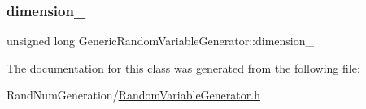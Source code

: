 \subsubsection{\texorpdfstring{dimension\+\_\+}{dimension\_}}
{\footnotesize\ttfamily unsigned long Generic\+Random\+Variable\+Generator\+::dimension\+\_\+\hspace{0.3cm}{\ttfamily [protected]}}



The documentation for this class was generated from the following file\+:\begin{DoxyCompactItemize}
\item 
Rand\+Num\+Generation/\hyperlink{_random_variable_generator_8h}{Random\+Variable\+Generator.\+h}\end{DoxyCompactItemize}

